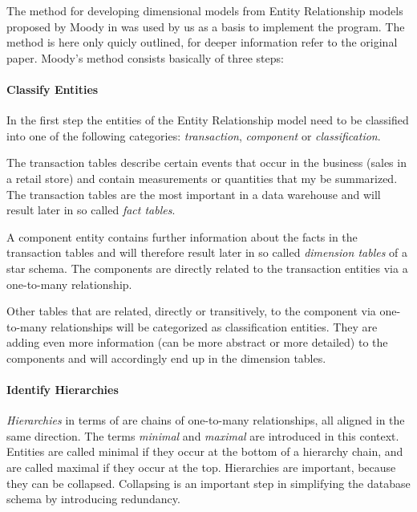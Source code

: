 
The method for developing dimensional models from Entity Relationship models proposed by Moody \andothers in \cite{moody2000enterprise} was used by us as a basis to implement the program.
The method is here only quicly outlined, for deeper information refer to the original paper.
Moody's method consists basically of three steps:

\paragraph{Classify Entities}
\label{par:classifyEntities}

In the first step the entities of the Entity Relationship model need to be classified into one of the following categories: \emph{transaction}, \emph{component} or \emph{classification}.

The transaction tables describe certain events that occur in the business (\eg sales in a retail store) and contain measurements or quantities that my be summarized.
The transaction tables are the most important in a data warehouse and will result later in so called \emph{fact tables}.

A component entity contains further information about the facts in the transaction tables and will therefore result later in so called \emph{dimension tables} of a star schema.
The components are directly related to the transaction entities via a one-to-many relationship.

Other tables that are related, directly or transitively, to the component via one-to-many relationships will be categorized as classification entities.
They are adding even more information (can be more abstract or more detailed) to the components and will accordingly end up in the dimension tables.

\paragraph{Identify Hierarchies}

\emph{Hierarchies} in terms of \cite{moody2000enterprise} are chains of one-to-many relationships, all aligned in the same direction.
The terms \emph{minimal} and \emph{maximal} are introduced in this context.
Entities are called minimal if they occur at the bottom of a hierarchy chain, and are called maximal if they occur at the top.
Hierarchies are important, because they can be collapsed.
Collapsing is an important step in simplifying the database schema by introducing redundancy.

